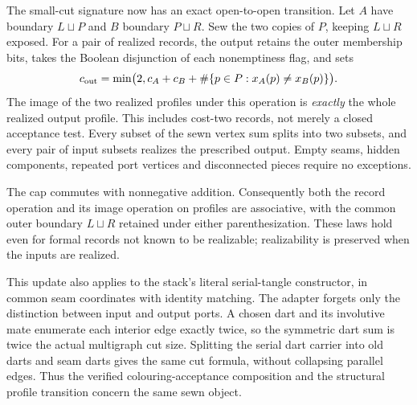 The small-cut signature now has an exact open-to-open transition.
Let $A$ have boundary $L\sqcup P$ and $B$ boundary $P\sqcup R$.
Sew the two copies of $P$, keeping $L\sqcup R$ exposed. For a pair
of realized records, the output retains the outer membership bits,
takes the Boolean disjunction of each nonemptiness flag, and sets
\[
 c_{\rm out}=\min\bigl(2,c_A+c_B+
       \#\{p\in P:x_A(p)\ne x_B(p)\}\bigr).
\]
The image of the two realized profiles under this operation is
\emph{exactly} the whole realized output profile. This includes
cost-two records, not merely a closed acceptance test. Every subset of
the sewn vertex sum splits into two subsets, and every pair of input
subsets realizes the prescribed output. Empty seams, hidden components,
repeated port vertices and disconnected pieces require no exceptions.

The cap commutes with nonnegative addition. Consequently both the
record operation and its image operation on profiles are associative,
with the common outer boundary $L\sqcup R$ retained under either
parenthesization. These laws hold even for formal records not known to
be realizable; realizability is preserved when the inputs are realized.

This update also applies to the stack's literal serial-tangle
constructor, in common seam coordinates with identity matching. The
adapter forgets only the distinction between input and output ports.
A chosen dart and its involutive mate enumerate each interior edge
exactly twice, so the symmetric dart sum is twice the actual multigraph
cut size. Splitting the serial dart carrier into old darts and seam
darts gives the same cut formula, without collapsing parallel edges.
Thus the verified colouring-acceptance composition and the structural
profile transition concern the same sewn object.

